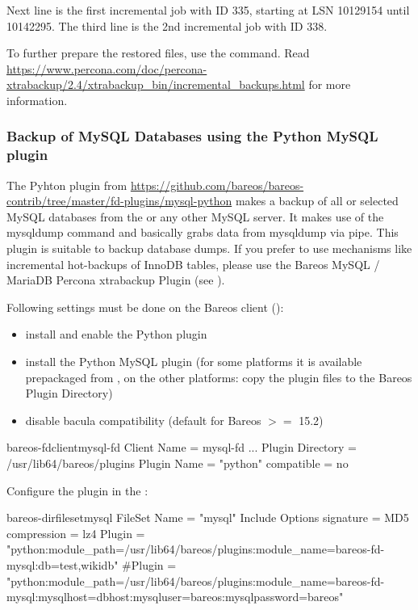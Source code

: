 Next line is the first incremental job with ID 335, starting at LSN 10129154 until 10142295. The third line is the 2nd incremental job with ID 338.

To further prepare the restored files, use the  command. 
Read \url{https://www.percona.com/doc/percona-xtrabackup/2.4/xtrabackup_bin/incremental_backups.html} for more information.


\subsubsection{Backup of MySQL Databases using the Python MySQL plugin}
\label{backup-mysql-python}

The Pyhton plugin from \url{https://github.com/bareos/bareos-contrib/tree/master/fd-plugins/mysql-python} makes a backup of all or selected 
MySQL databases from the \bareosFd or any other MySQL server. It makes use of the mysqldump command and basically grabs data from mysqldump via pipe.
This plugin is suitable to backup database dumps. 
If you prefer to use mechanisms like incremental hot-backups of InnoDB tables, please use the Bareos MySQL / MariaDB Percona xtrabackup Plugin (see ).

Following settings must be done on the Bareos client (\bareosFd):
\begin{itemize}
  \item install and enable the \bareosFd Python plugin
  \item install the Python MySQL plugin (for some platforms it is available prepackaged from \contribDownloadBareosOrg, on the other platforms: copy the plugin files to the Bareos Plugin Directory)
  \item disable bacula compatibility (default for Bareos $>=$ 15.2)
\end{itemize}

\begin{bareosConfigResource}{bareos-fd}{client}{mysql-fd}
Client {
  Name = mysql-fd
  ...
  Plugin Directory = /usr/lib64/bareos/plugins
  Plugin Name = "python"
  compatible = no
}
\end{bareosConfigResource}

Configure the plugin in the \bareosDir:

\begin{bareosConfigResource}{bareos-dir}{fileset}{mysql}
FileSet {
    Name = "mysql"
    Include {
      Options {
        signature = MD5
        compression = lz4
      }
      Plugin = "python:module_path=/usr/lib64/bareos/plugins:module_name=bareos-fd-mysql:db=test,wikidb"
      #Plugin = "python:module_path=/usr/lib64/bareos/plugins:module_name=bareos-fd-mysql:mysqlhost=dbhost:mysqluser=bareos:mysqlpassword=bareos"
    }
}
\end{bareosConfigResource}

